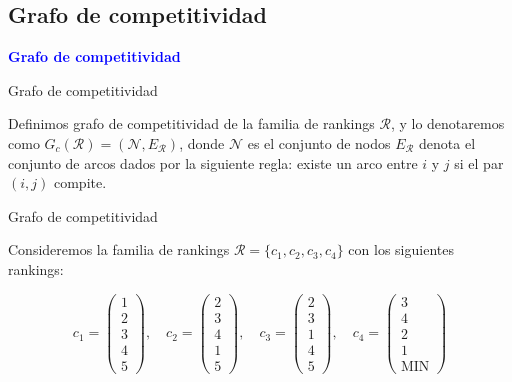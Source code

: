 \documentclass[10pt]{beamer}
\begin{document}
	\subsection{Grafo de competitividad}
	
	\begin{frame}
		\begin{center}
			\Huge\textbf{\textsf{\textcolor{blue}{Grafo de competitividad}}}
		\end{center}
	\end{frame}
	
	\begin{frame}{Grafo de competitividad}
		\begin{defi}
			Definimos grafo de competitividad de la familia de rankings $\mathcal{R}$, y lo denotaremos como $G_c(\mathcal{R}) = (\mathcal{N}, E_\mathcal{R})$, donde $\mathcal{N}$ es el conjunto de nodos $E_\mathcal{R}$ denota el conjunto de arcos dados por la siguiente regla: existe un arco entre $i$ y $j$ si el par $(i,j)$ compite.
		\end{defi}
	\end{frame}
	
	\begin{frame}{Grafo de competitividad}
		\begin{ejemplo}
			Consideremos la familia de rankings $\mathcal{R} = \{c_1, c_2, c_3, c_4\}$ con los siguientes rankings:
			
			\begin{equation*}
			c_1 = \left( \begin{array}{c}
			1 \\
			2 \\
			3 \\
			4 \\
			5
			\end{array} \right), \quad
			c_2 = \left( \begin{array}{c}
			2 \\
			3 \\
			4 \\
			1 \\
			5
			\end{array} \right), \quad
			c_3 = \left( \begin{array}{c}
			2 \\
			3 \\
			1 \\
			4 \\
			5
			\end{array} \right), \quad
			c_4 = \left( \begin{array}{c}
			3 \\
			4 \\
			2 \\
			1 \\
			\text{MIN}
			\end{array} \right)
			\end{equation*}
		
		\end{ejemplo}
	\end{frame}
	
\end{document}
